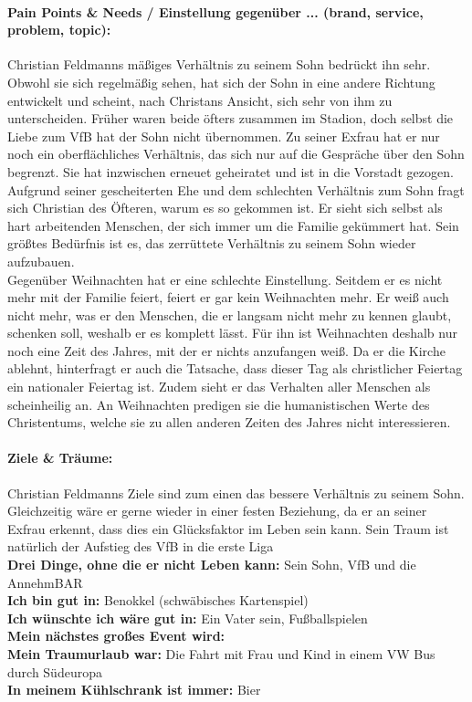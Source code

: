 \documentclass[12pt,ngerman, fleqn]{book} %
\begin{document}
\paragraph{Pain Points & Needs / Einstellung gegenüber ... (brand, service, problem, topic):}
Christian Feldmanns mäßiges Verhältnis zu seinem Sohn bedrückt ihn sehr. Obwohl sie sich regelmäßig sehen, hat sich der Sohn in eine andere Richtung entwickelt und scheint, nach Christans Ansicht, sich sehr von ihm zu unterscheiden. Früher waren beide öfters zusammen im Stadion, doch selbst die Liebe zum VfB hat der Sohn nicht übernommen. Zu seiner Exfrau hat er nur noch ein oberflächliches Verhältnis, das sich nur auf die Gespräche über den Sohn begrenzt. Sie hat inzwischen erneuet geheiratet und ist in die Vorstadt gezogen. Aufgrund seiner gescheiterten Ehe und dem schlechten Verhältnis zum Sohn fragt sich Christian des Öfteren, warum es so gekommen ist. Er sieht sich selbst als hart arbeitenden Menschen, der sich immer um die Familie gekümmert hat. Sein größtes Bedürfnis ist es, das zerrüttete Verhältnis zu seinem Sohn wieder aufzubauen.\\
Gegenüber Weihnachten hat er eine schlechte Einstellung. Seitdem er es nicht mehr mit der Familie feiert, feiert er gar kein Weihnachten mehr. Er weiß auch nicht mehr, was er den Menschen, die er langsam nicht mehr zu kennen glaubt, schenken soll, weshalb er es komplett lässt. Für ihn ist Weihnachten deshalb nur noch eine Zeit des Jahres, mit der er nichts anzufangen weiß. Da er die Kirche ablehnt, hinterfragt er auch die Tatsache, dass dieser Tag als christlicher Feiertag ein nationaler Feiertag ist. Zudem sieht er das Verhalten aller Menschen als scheinheilig an. An Weihnachten predigen sie die humanistischen Werte des Christentums, welche sie zu allen anderen Zeiten des Jahres nicht interessieren.\\
\hline
\paragraph{Ziele & Träume:}
Christian Feldmanns Ziele sind zum einen das bessere Verhältnis zu seinem Sohn. Gleichzeitig wäre er gerne wieder in einer festen Beziehung, da er an seiner Exfrau erkennt, dass dies ein Glücksfaktor im Leben sein kann. Sein Traum ist natürlich der Aufstieg des VfB in die erste Liga\\
\hline
\textbf{Drei Dinge, ohne die er nicht Leben kann:} Sein Sohn, VfB und die AnnehmBAR\\
\textbf{Ich bin gut in:} Benokkel (schwäbisches Kartenspiel) \\
\textbf{Ich wünschte ich wäre gut in:} Ein Vater sein, Fußballspielen \\
\textbf{Mein nächstes großes Event wird:}  \\
\textbf{Mein Traumurlaub war:} Die Fahrt mit Frau und Kind in einem VW Bus durch Südeuropa \\
\textbf{In meinem Kühlschrank ist immer:} Bier \\
\hline
\end{document}
